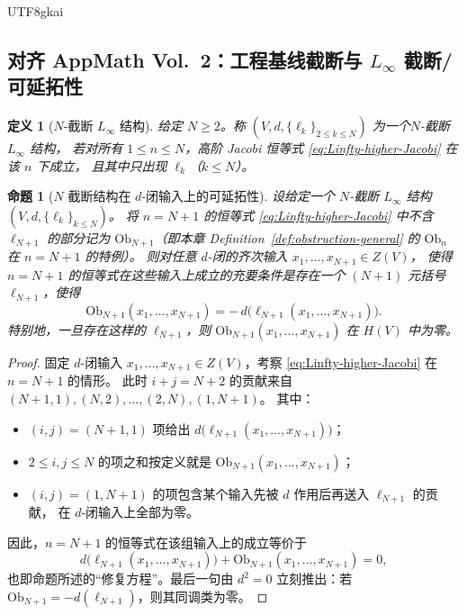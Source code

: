 \documentclass[12pt]{article}
\newtheorem{definition}{定义}[section]
\newtheorem{proposition}{命题}[section]
\newcommand{\Layer}{\ensuremath{\ell}}
\newcommand{\Ob}{\mathrm{Ob}}
\begin{document}
\begin{CJK*}{UTF8}{gkai}
\subsection{对齐 AppMath Vol.~2：工程基线截断与 $L_\infty$ 截断/可延拓性}

\begin{definition}[$N$-截断 $L_\infty$ 结构]
\label{def:N-truncated-Linfty}
给定 $N\ge 2$。称 $(V,d,\{\Layer_k\}_{2\le k\le N})$ 为一个\emph{$N$-截断 $L_\infty$ 结构}，
若对所有 $1\le n\le N$，高阶 Jacobi 恒等式 \eqref{eq:Linfty-higher-Jacobi} 在该 $n$ 下成立，
且其中只出现 $\Layer_k$（$k\le N$）。
\end{definition}

\begin{proposition}[$N$ 截断结构在 $d$-闭输入上的可延拓性]
\label{prop:extension-obstruction}
设给定一个 $N$-截断 $L_\infty$ 结构 $(V,d,\{\Layer_k\}_{k\le N})$。
将 $n=N+1$ 的恒等式 \eqref{eq:Linfty-higher-Jacobi} 中\emph{不含} $\Layer_{N+1}$ 的部分记为
$\Ob_{N+1}$（即本章 Definition~\ref{def:obstruction-general} 的 $\Ob_n$ 在 $n=N+1$ 的特例）。
则对任意 $d$-闭的齐次输入 $x_1,\dots,x_{N+1}\in Z(V)$，
使得 $n=N+1$ 的恒等式在这些输入上成立的充要条件是存在一个 $(N+1)$ 元括号 $\Layer_{N+1}$，使得
\[
  \Ob_{N+1}(x_1,\dots,x_{N+1}) = -\,d\bigl(\Layer_{N+1}(x_1,\dots,x_{N+1})\bigr).
\]
特别地，一旦存在这样的 $\Layer_{N+1}$，则 $\Ob_{N+1}(x_1,\dots,x_{N+1})$ 在 $H(V)$ 中为零。
\end{proposition}

\begin{proof}
固定 $d$-闭输入 $x_1,\dots,x_{N+1}\in Z(V)$，考察 \eqref{eq:Linfty-higher-Jacobi} 在 $n=N+1$ 的情形。
此时 $i+j=N+2$ 的贡献来自 $(N+1,1),(N,2),\dots,(2,N),(1,N+1)$。
其中：
\begin{itemize}
  \item $(i,j)=(N+1,1)$ 项给出 $d\bigl(\Layer_{N+1}(x_1,\dots,x_{N+1})\bigr)$；
  \item $2\le i,j\le N$ 的项之和按定义就是 $\Ob_{N+1}(x_1,\dots,x_{N+1})$；
  \item $(i,j)=(1,N+1)$ 的项包含某个输入先被 $d$ 作用后再送入 $\Layer_{N+1}$ 的贡献，
        在 $d$-闭输入上全部为零。
\end{itemize}
因此，$n=N+1$ 的恒等式在该组输入上的成立等价于
\[
  d\bigl(\Layer_{N+1}(x_1,\dots,x_{N+1})\bigr)+\Ob_{N+1}(x_1,\dots,x_{N+1})=0,
\]
也即命题所述的“修复方程”。最后一句由 $d^2=0$ 立刻推出：若 $\Ob_{N+1}=-d(\Layer_{N+1})$，则其同调类为零。
\end{proof}


\end{CJK*}
\end{document}
